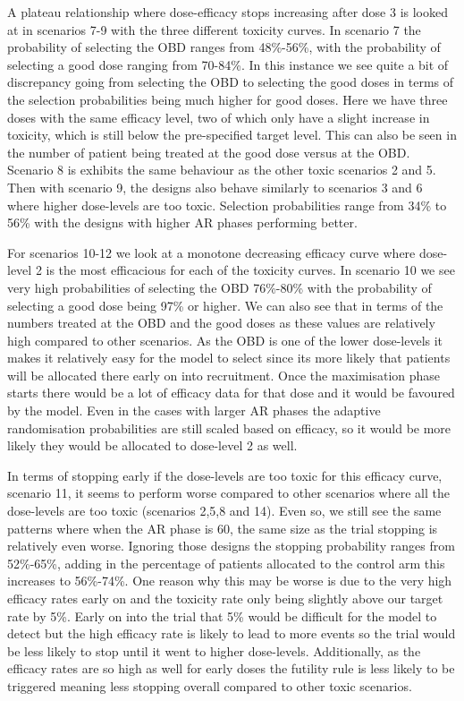 A plateau relationship where dose-efficacy stops increasing after dose 3 is looked at in scenarios 7-9 with the three different toxicity curves. In scenario 7 the probability of selecting the OBD ranges from 48\%-56\%, with the probability of selecting a good dose ranging from 70-84\%. In this instance we see quite a bit of discrepancy going from selecting the OBD to selecting the good doses in terms of the selection probabilities being much higher for good doses. Here we have three doses with the same efficacy level, two of which only have a slight increase in toxicity, which is still below the pre-specified target level. This can also be seen in the number of patient being treated at the good dose versus at the OBD. Scenario 8 is exhibits the same behaviour as the other toxic scenarios 2 and 5. Then with scenario 9, the designs also behave similarly to scenarios 3 and 6 where higher dose-levels are too toxic. Selection probabilities range from 34\% to 56\% with the designs with higher AR phases performing better. 

For scenarios 10-12 we look at a monotone decreasing efficacy curve where dose-level 2 is the most efficacious for each of the toxicity curves. In scenario 10 we see very high probabilities of selecting the OBD 76\%-80\% with the probability of selecting a good dose being 97\% or higher. We can also see that in terms of the numbers treated at the OBD and the good doses as these values are relatively high compared to other scenarios. As the OBD is one of the lower dose-levels it makes it relatively easy for the model to select since its more likely that patients will be allocated there early on into recruitment. Once the maximisation phase starts there would be a lot of efficacy data for that dose and it would be favoured by the model. Even in the cases with larger AR phases the adaptive randomisation probabilities are still scaled based on efficacy, so it would be more likely they would be allocated to dose-level 2 as well. 

In terms of stopping early if the dose-levels are too toxic for this efficacy curve, scenario 11, it seems to perform worse compared to other scenarios where all the dose-levels are too toxic (scenarios 2,5,8 and 14). Even so, we still see the same patterns where when the AR phase is 60, the same size as the trial stopping is relatively even worse. Ignoring those designs the stopping probability ranges from 52\%-65\%, adding in the percentage of patients allocated to the control arm this increases to 56\%-74\%. One reason why this may be worse is due to the very high efficacy rates early on and the toxicity rate only being slightly above our target rate by 5\%. Early on into the trial that 5\% would be difficult for the model to detect but the high efficacy rate is likely to lead to more events so the trial would be less likely to stop until it went to higher dose-levels. Additionally, as the efficacy rates are so high as well for early doses the futility rule is less likely to be triggered meaning less stopping overall compared to other toxic scenarios.  

